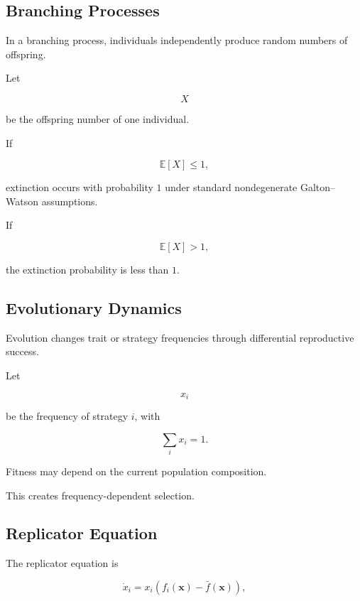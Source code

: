 \subsection{Branching Processes}
\label{subsec:branching-processes-biology}

In a branching process, individuals independently produce random numbers of
offspring.

Let

\[
X
\]

be the offspring number of one individual.

If

\[
\boxed{
\mathbb{E}[X]\leq1,
}
\]

extinction occurs with probability \(1\) under standard nondegenerate
Galton--Watson assumptions.

If

\[
\boxed{
\mathbb{E}[X]>1,
}
\]

the extinction probability is less than \(1\).

\subsection{Evolutionary Dynamics}
\label{subsec:evolutionary-dynamics}

Evolution changes trait or strategy frequencies through differential
reproductive success.

Let

\[
x_i
\]

be the frequency of strategy \(i\), with

\[
\boxed{
\sum_i x_i=1.
}
\]

Fitness may depend on the current population composition.

This creates frequency-dependent selection.

\subsection{Replicator Equation}
\label{subsec:replicator-equation}

The replicator equation is

\[
\boxed{
\dot{x}_i
=
x_i
\left(
f_i(\mathbf{x})
-
\bar{f}(\mathbf{x})
\right),
}
\]

